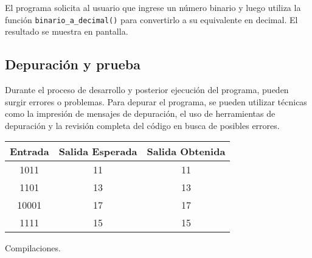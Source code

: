 El programa solicita al usuario que ingrese un número binario y luego utiliza la función \texttt{binario\_a\_decimal()} para convertirlo a su equivalente en decimal. El resultado se muestra en pantalla.

\subsection{Depuración y prueba}

Durante el proceso de desarrollo y posterior ejecución del programa, pueden surgir errores o problemas. Para depurar el programa, se pueden utilizar técnicas como la impresión de mensajes de depuración, el uso de herramientas de depuración y la revisión completa del código en busca de posibles errores.\\

\begin{tabular}{|c|c|c|}
  \hline
  \textbf{Entrada} & \textbf{Salida Esperada} & \textbf{Salida Obtenida} \\
  \hline
  1011 & 11 & 11 \\
  \hline
  1101 & 13 & 13 \\
  \hline
  10001 & 17 & 17 \\
  \hline
  1111 & 15 & 15 \\
  \hline
\end{tabular}
\caption{Compilaciones.}
